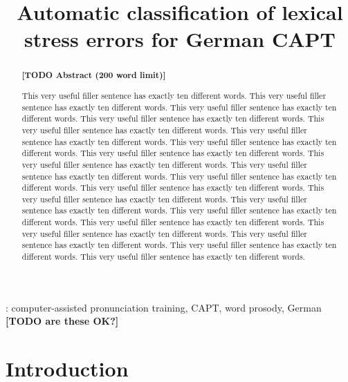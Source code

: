 \documentclass[a4paper]{article}
\title{Automatic classification of lexical stress errors for German CAPT}
\newcommand{\TODO}[1]{{\color{red}\textbf{[TODO #1]}}}
\begin{document}
  \maketitle
  \begin{abstract}
  
    \TODO{Abstract (200 word limit)}
  
  	This very useful filler sentence has exactly ten different words. This very useful filler sentence has exactly ten different words. This very useful filler sentence has exactly ten different words. This very useful filler sentence has exactly ten different words. This very useful filler sentence has exactly ten different words. This very useful filler sentence has exactly ten different words. This very useful filler sentence has exactly ten different words. This very useful filler sentence has exactly ten different words. This very useful filler sentence has exactly ten different words. This very useful filler sentence has exactly ten different words. This very useful filler sentence has exactly ten different words. This very useful filler sentence has exactly ten different words. This very useful filler sentence has exactly ten different words. This very useful filler sentence has exactly ten different words. This very useful filler sentence has exactly ten different words. This very useful filler sentence has exactly ten different words. This very useful filler sentence has exactly ten different words. This very useful filler sentence has exactly ten different words. This very useful filler sentence has exactly ten different words. This very useful filler sentence has exactly ten different words. 
    
    
    
  \end{abstract}
  : computer-assisted pronunciation training, CAPT, word prosody, German \TODO{are these OK?}


  \section{Introduction}
  
  
\end{document}
